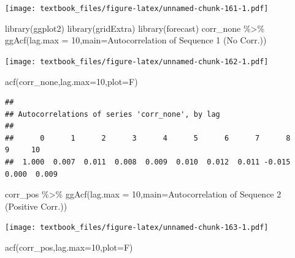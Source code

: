 \documentclass[
  11pt,
]{book}
\newenvironment{Shaded}{\begin{snugshade}}{\end{snugshade}}
\newcommand{\AttributeTok}[1]{\textcolor[rgb]{0.77,0.63,0.00}{#1}}
\newcommand{\DecValTok}[1]{\textcolor[rgb]{0.00,0.00,0.81}{#1}}
\newcommand{\FunctionTok}[1]{\textcolor[rgb]{0.00,0.00,0.00}{#1}}
\newcommand{\NormalTok}[1]{#1}
\newcommand{\SpecialCharTok}[1]{\textcolor[rgb]{0.00,0.00,0.00}{#1}}
\newcommand{\StringTok}[1]{\textcolor[rgb]{0.31,0.60,0.02}{#1}}
\theoremstyle{definition}
\theoremstyle{definition}
\theoremstyle{definition}
\theoremstyle{definition}
\theoremstyle{remark}
\begin{document}
\texttt{[image: textbook\_files/figure-latex/unnamed-chunk-161-1.pdf]}

\vfill

\newpage

\begin{Shaded}
\begin{Highlighting}[]
\FunctionTok{library}\NormalTok{(ggplot2)}
\FunctionTok{library}\NormalTok{(gridExtra)}
\FunctionTok{library}\NormalTok{(forecast)}
\NormalTok{corr\_none }\SpecialCharTok{\%\textgreater{}\%} \FunctionTok{ggAcf}\NormalTok{(}\AttributeTok{lag.max =} \DecValTok{10}\NormalTok{,}\AttributeTok{main=}\StringTok{\textquotesingle{}Autocorrelation of Sequence 1 (No Corr.)\textquotesingle{}}\NormalTok{)}
\end{Highlighting}
\end{Shaded}

\texttt{[image: textbook\_files/figure-latex/unnamed-chunk-162-1.pdf]}

\begin{Shaded}
\begin{Highlighting}[]
\FunctionTok{acf}\NormalTok{(corr\_none,}\AttributeTok{lag.max=}\DecValTok{10}\NormalTok{,}\AttributeTok{plot=}\NormalTok{F)}
\end{Highlighting}
\end{Shaded}

\begin{verbatim}
## 
## Autocorrelations of series 'corr_none', by lag
## 
##      0      1      2      3      4      5      6      7      8      9     10 
##  1.000  0.007  0.011  0.008  0.009  0.010  0.012  0.011 -0.015  0.000  0.009
\end{verbatim}

\newpage

\begin{Shaded}
\begin{Highlighting}[]
\NormalTok{corr\_pos }\SpecialCharTok{\%\textgreater{}\%} \FunctionTok{ggAcf}\NormalTok{(}\AttributeTok{lag.max =} \DecValTok{10}\NormalTok{,}\AttributeTok{main=}\StringTok{\textquotesingle{}Autocorrelation of Sequence 2 (Positive Corr.)\textquotesingle{}}\NormalTok{)}
\end{Highlighting}
\end{Shaded}

\texttt{[image: textbook\_files/figure-latex/unnamed-chunk-163-1.pdf]}

\begin{Shaded}
\begin{Highlighting}[]
\FunctionTok{acf}\NormalTok{(corr\_pos,}\AttributeTok{lag.max=}\DecValTok{10}\NormalTok{,}\AttributeTok{plot=}\NormalTok{F)}
\end{Highlighting}
\end{Shaded}
\end{document}
